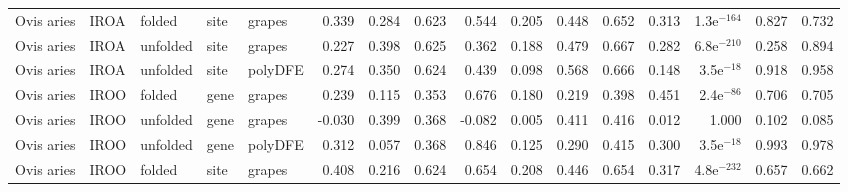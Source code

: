 \begin{longtable}{lllllrrrrrrrrrrr}
          Ovis aries &                      IROA &    folded &  site &   grapes &                              0.339 &                               0.284 &                 0.623 &                 0.544 &                              0.205 &                               0.448 &                 0.652 &                 0.313 & 1.3e$^{-164}$ &  0.827 &  0.732 \\
          Ovis aries &                      IROA &  unfolded &  site &   grapes &                              0.227 &                               0.398 &                 0.625 &                 0.362 &                              0.188 &                               0.479 &                 0.667 &                 0.282 & 6.8e$^{-210}$ &  0.258 &  0.894 \\
          Ovis aries &                      IROA &  unfolded &  site &  polyDFE &                              0.274 &                               0.350 &                 0.624 &                 0.439 &                              0.098 &                               0.568 &                 0.666 &                 0.148 &  3.5e$^{-18}$ &  0.918 &  0.958 \\
          Ovis aries &                      IROO &    folded &  gene &   grapes &                              0.239 &                               0.115 &                 0.353 &                 0.676 &                              0.180 &                               0.219 &                 0.398 &                 0.451 &  2.4e$^{-86}$ &  0.706 &  0.705 \\
          Ovis aries &                      IROO &  unfolded &  gene &   grapes &                             -0.030 &                               0.399 &                 0.368 &                -0.082 &                              0.005 &                               0.411 &                 0.416 &                 0.012 &         1.000 &  0.102 &  0.085 \\
          Ovis aries &                      IROO &  unfolded &  gene &  polyDFE &                              0.312 &                               0.057 &                 0.368 &                 0.846 &                              0.125 &                               0.290 &                 0.415 &                 0.300 &  3.5e$^{-18}$ &  0.993 &  0.978 \\
          Ovis aries &                      IROO &    folded &  site &   grapes &                              0.408 &                               0.216 &                 0.624 &                 0.654 &                              0.208 &                               0.446 &                 0.654 &                 0.317 & 4.8e$^{-232}$ &  0.657 &  0.662 \\

\end{longtable}
